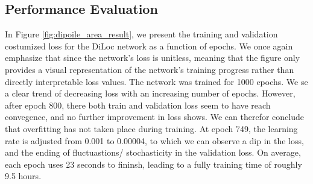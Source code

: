 \documentclass[a4paper, UKenglish, 11pt]{uiomaster}
\begin{document}



\subsection{Performance Evaluation}

In Figure \ref{fig:dipoile_area_result}, we present the training and validation costumized loss for the DiLoc network as a function of epochs. We once again emphasize that since the network's loss is unitless, meaning that the figure only provides a visual representation of the network's training progress rather than directly interpretable loss values. The network was trained for 1000 epochs. We se a clear trend of decreasing loss with an increasing number of epochs. However, after epoch 800, there both train and validation loss seem to have reach convegence, and no further improvement in loss shows. We can therefor conclude that overfitting has not taken place during training. At epoch 749, the learning rate is adjusted from 0.001 to 0.00004, to which we can observe a dip in the loss, and the ending of fluctuastions/ stochasticity in the validation loss. On average, each epoch uses 23 seconds to fininsh, leading to a fully training time of roughly 9.5 hours.
\end{document}
